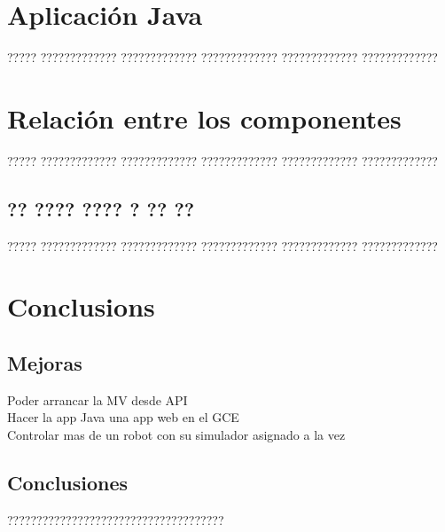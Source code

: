 \documentclass[12pt,spanish,listoffigures,listoftables]{tfgetsinf}
\begin{document}
\chapter{Aplicación Java}

????? ????????????? ????????????? ????????????? ????????????? ?????????????

\chapter{Relación entre los componentes}

????? ????????????? ????????????? ????????????? ????????????? ????????????? 

\section{?? ???? ???? ? ?? ??}

????? ????????????? ????????????? ????????????? ????????????? ?????????????


\chapter{Conclusions}

\section{Mejoras} 

Poder arrancar la MV desde API \\
Hacer la app Java una app web en el GCE \\
Controlar mas de un robot con su simulador asignado a la vez

\section{Conclusiones}

?????????????????????????????????????

\end{document}

